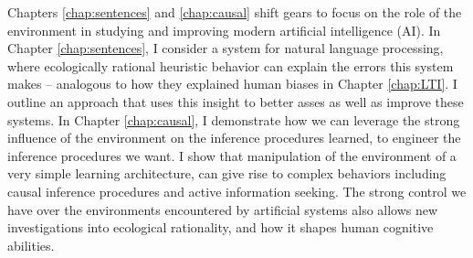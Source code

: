 Chapters \ref{chap:sentences} and \ref{chap:causal} shift gears to focus on the role of the environment in studying and improving modern artificial intelligence (AI).  In Chapter \ref{chap:sentences}, I consider a system for natural language processing, where ecologically rational heuristic behavior can explain the errors this system makes -- analogous to how they explained human biases in Chapter \ref{chap:LTI}. I outline an approach that uses this insight to better asses as well as improve these systems. In Chapter \ref{chap:causal}, I demonstrate how we can leverage the strong influence of the environment on the inference procedures learned, to engineer the inference procedures we want. I show that manipulation of the environment of a very simple learning architecture, can give rise to complex behaviors including causal inference procedures and active information seeking. The strong control we have over the environments encountered by artificial systems also allows new investigations into ecological rationality, and how it shapes human cognitive abilities.